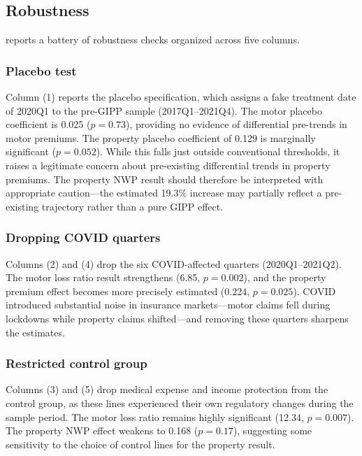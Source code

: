 \documentclass[12pt]{article}
\begin{document}


\subsection{Robustness}

 reports a battery of robustness checks organized across five columns.

\subsubsection*{Placebo test} Column (1) reports the placebo specification, which assigns a fake treatment date of 2020Q1 to the pre-GIPP sample (2017Q1--2021Q4). The motor placebo coefficient is 0.025 ($p = 0.73$), providing no evidence of differential pre-trends in motor premiums. The property placebo coefficient of 0.129 is marginally significant ($p = 0.052$). While this falls just outside conventional thresholds, it raises a legitimate concern about pre-existing differential trends in property premiums. The property NWP result should therefore be interpreted with appropriate caution---the estimated 19.3\% increase may partially reflect a pre-existing trajectory rather than a pure GIPP effect.

\subsubsection*{Dropping COVID quarters} Columns (2) and (4) drop the six COVID-affected quarters (2020Q1--2021Q2). The motor loss ratio result strengthens (6.85, $p = 0.002$), and the property premium effect becomes more precisely estimated (0.224, $p = 0.025$). COVID introduced substantial noise in insurance markets---motor claims fell during lockdowns while property claims shifted---and removing these quarters sharpens the estimates.

\subsubsection*{Restricted control group} Columns (3) and (5) drop medical expense and income protection from the control group, as these lines experienced their own regulatory changes during the sample period. The motor loss ratio remains highly significant (12.34, $p = 0.007$). The property NWP effect weakens to 0.168 ($p = 0.17$), suggesting some sensitivity to the choice of control lines for the property result.
\end{document}

